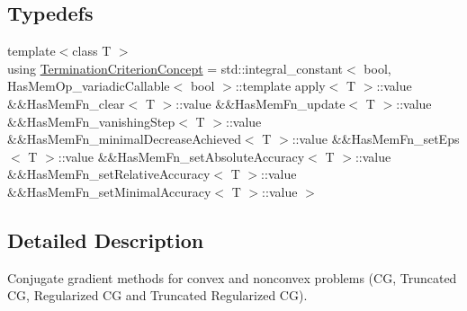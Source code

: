 \subsection*{Typedefs}
\begin{DoxyCompactItemize}
\item 
{\footnotesize template$<$class T $>$ }\\using \hyperlink{group__ConceptGroup_ga5a296e4942cbfeba1e8538594a6e9c26}{Termination\+Criterion\+Concept} = std\+::integral\+\_\+constant$<$ bool, Has\+Mem\+Op\+\_\+variadic\+Callable$<$ bool $>$\+::template apply$<$ T $>$\+::value \&\&Has\+Mem\+Fn\+\_\+clear$<$ T $>$\+::value \&\&Has\+Mem\+Fn\+\_\+update$<$ T $>$\+::value \&\&Has\+Mem\+Fn\+\_\+vanishing\+Step$<$ T $>$\+::value \&\&Has\+Mem\+Fn\+\_\+minimal\+Decrease\+Achieved$<$ T $>$\+::value \&\&Has\+Mem\+Fn\+\_\+set\+Eps$<$ T $>$\+::value \&\&Has\+Mem\+Fn\+\_\+set\+Absolute\+Accuracy$<$ T $>$\+::value \&\&Has\+Mem\+Fn\+\_\+set\+Relative\+Accuracy$<$ T $>$\+::value \&\&Has\+Mem\+Fn\+\_\+set\+Minimal\+Accuracy$<$ T $>$\+::value $>$
\end{DoxyCompactItemize}


\subsection{Detailed Description}
Conjugate gradient methods for convex and nonconvex problems (C\+G, Truncated C\+G, Regularized C\+G and Truncated Regularized C\+G). 